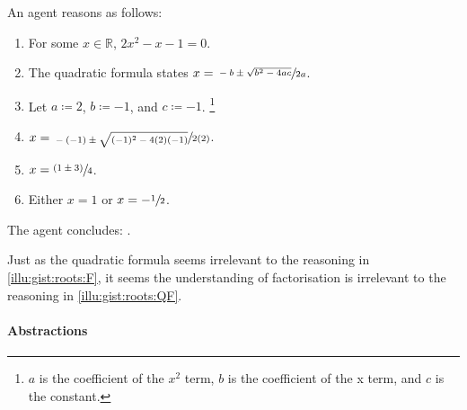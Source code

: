 \begin{note}
  \begin{scenario}%
    \label{illu:gist:roots:QF}%
    An agent reasons as follows:
    \begin{enumerate}[label=\arabic*., ref=(\arabic*)]
    \item
      \label{illu:gist:roots:QF:eq}
      For some \(x \in \mathbb{R}\), \(2x^{2} - x - 1 = 0\).
    \item
      \label{illu:gist:roots:QF:qf}
      The quadratic formula states \(x = \sfrac{-b \pm \sqrt{b^{2} - 4ac}}{2a}\).%
    \item
      \label{illu:gist:roots:QF:subs}
      Let \(a \coloneq 2\), \(b \coloneq -1\), and \(c \coloneq -1\).%
      \footnote{
        \(a\) is the coefficient of the \(x^{2}\) term, \(b\) is the coefficient of the x term, and \(c\) is the constant.
      }
    \item
      \label{illu:gist:roots:QF:qf-subs}
      \(x = \sfrac{-(-1) \pm \sqrt{(-1)^{2} - 4(2)(-1)}}{2(2)}\).%
    \item
      \label{illu:gist:roots:QF:qf:1}
      \(x = \sfrac{(1 \pm 3)}{4}\).%
    \item
      \label{illu:gist:roots:QF:qf:done}
      Either \(x = 1\) or \(x = -\sfrac{1}{2}\).%
    \end{enumerate}
    The agent concludes:
    \rootsCon{}.
  \end{scenario}

  \noindent%
  Just as the quadratic formula seems irrelevant to the \agents{} reasoning in \autoref{illu:gist:roots:F}, it seems the \agents{} understanding of factorisation is irrelevant to the \agents{} reasoning in \autoref{illu:gist:roots:QF}.
\end{note}



\paragraph*{Abstractions}


